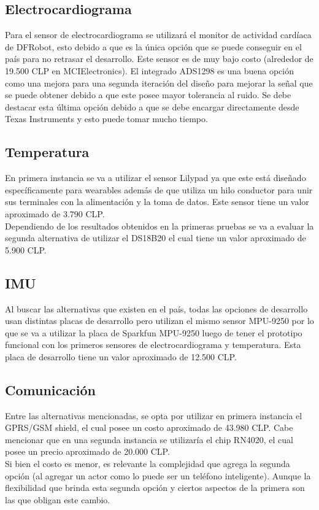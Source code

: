\subsection{Electrocardiograma}
Para el sensor de electrocardiograma se utilizará el monitor de actividad cardíaca de DFRobot, esto debido a que es la única opción que se puede conseguir en el país para no retrasar el desarrollo. Este sensor es de muy bajo costo (alrededor de 19.500 CLP en MCIElectronics).
El integrado ADS1298 es una buena opción como una mejora para una segunda iteración del diseño para mejorar la señal que se puede obtener debido a que este posee mayor tolerancia al ruido. Se debe destacar esta última opción debido a que se debe encargar directamente desde Texas Instruments y esto puede tomar mucho tiempo.

\newpage
\subsection{Temperatura}
En primera instancia se va a utilizar el sensor Lilypad ya que este está diseñado específicamente para wearables además de que utiliza un hilo conductor para unir sus terminales con la alimentación y la toma de datos. Este sensor tiene un valor aproximado de 3.790 CLP.\\
Dependiendo de los resultados obtenidos en la primeras pruebas se va a evaluar la segunda alternativa de utilizar el DS18B20 el cual tiene un valor aproximado de 5.900 CLP.
\subsection{IMU}
Al buscar las alternativas que existen en el país, todas las opciones de desarrollo usan distintas placas de desarrollo pero utilizan el mismo sensor MPU-9250 por lo que se va a utilizar la placa de Sparkfun MPU-9250 luego de tener el prototipo funcional con los primeros sensores de electrocardiograma y temperatura. Esta placa de desarrollo tiene un valor aproximado de 12.500 CLP.
\subsection{Comunicación}
Entre las alternativas mencionadas, se opta por utilizar en primera instancia el GPRS/GSM shield, el cual posee un costo aproximado de 43.980 CLP.
Cabe mencionar que en una segunda instancia se utilizaría el chip RN4020, el cual posee un precio aproximado de 20.000 CLP.\\
Si bien el costo es menor, es relevante la complejidad que agrega la segunda opción (al agregar un actor como lo puede ser un teléfono inteligente). Aunque la flexibilidad que brinda esta segunda opción y ciertos aspectos de la primera son las que obligan este cambio.